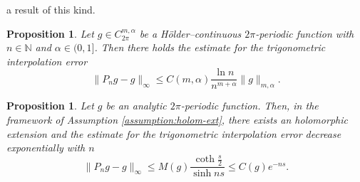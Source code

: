 \documentclass[10pt, a4paper, twoside, openright]{book}
\theoremstyle{definition}
\theoremstyle{plain}
\theoremstyle{plain}
\theoremstyle{plain}
\newtheorem{proposition}[subsection]{Proposition}
\theoremstyle{plain}
\theoremstyle{plain}
\theoremstyle{plain}
\theoremstyle{plain}
\theoremstyle{plain}
\begin{document}
a result of this kind.
\begin{proposition}
 Let $g\in C^{m,\alpha}_{2\pi}$ be a H\"{o}lder--continuous $2\pi$-periodic function with $n\in\mathbb{N}$ and $\alpha\in(0,1]$. Then there holds the estimate for the trigonometric interpolation error
 \begin{equation}
  \|P_ng - g\|_{\infty}\leq C(m,\alpha)\frac{\ln n}{n^{m+\alpha}}\|g\|_{m,\alpha}.
 \end{equation}
\end{proposition}
\begin{proposition}
 Let $g$ be an analytic $2\pi$-periodic function. Then, in the framework of Assumption \ref{assumption:holom-ext}, there exists an holomorphic extension and the estimate for the trigonometric interpolation error decrease exponentially with $n$
 \begin{equation}
  \|P_ng - g\|_{\infty}\leq M(g)\frac{\coth\frac{s}{2}}{\sinh ns} \leq C(g)e^{-ns}.
 \end{equation}
\end{proposition}
\end{document}
